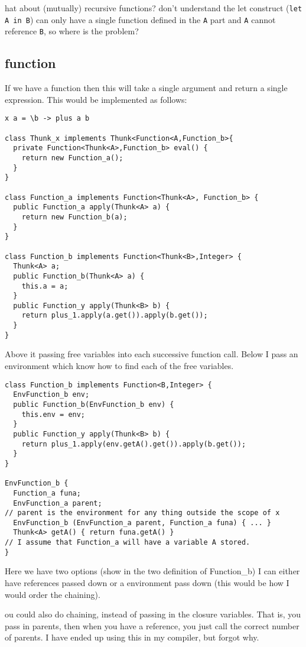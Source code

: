 \documentclass[12pt,a4paper,twoside]{article}
\def\comment#1\done{{\color{blue}#1}}
\begin{document}
\comment What about (mutually) recursive functions? \done 
\comment I don't understand the let construct (\texttt{let A in B}) can only have a single function defined in the 
 \texttt{A} part and \texttt{A} cannot reference \texttt{B}, so where is the problem? \done

\subsection{function}

If we have a function then this will take a single argument and return a single expression. This would be implemented as follows:

\begin{verbatim}
x a = \b -> plus a b

class Thunk_x implements Thunk<Function<A,Function_b>{
  private Function<Thunk<A>,Function_b> eval() {
    return new Function_a();
  }
}

class Function_a implements Function<Thunk<A>, Function_b> {
  public Function_a apply(Thunk<A> a) {
    return new Function_b(a);
  }
}

class Function_b implements Function<Thunk<B>,Integer> {
  Thunk<A> a;
  public Function_b(Thunk<A> a) {
    this.a = a;
  }
  public Function_y apply(Thunk<B> b) {
    return plus_1.apply(a.get()).apply(b.get());
  }
}
\end{verbatim}
Above it passing free variables into each successive function call. Below I pass an environment which 
know how to find each of the free variables.
\begin{verbatim}
class Function_b implements Function<B,Integer> {
  EnvFunction_b env;
  public Function_b(EnvFunction_b env) {
    this.env = env;
  }
  public Function_y apply(Thunk<B> b) {
    return plus_1.apply(env.getA().get()).apply(b.get());
  }
}

EnvFunction_b {
  Function_a funa;
  EnvFunction_a parent;
// parent is the environment for any thing outside the scope of x 
  EnvFunction_b (EnvFunction_a parent, Function_a funa) { ... }
  Thunk<A> getA() { return funa.getA() } 
// I assume that Function_a will have a variable A stored.
}
\end{verbatim}

Here we have two options (show in the two definition of Function\_b) I can either have references passed down
or a environment pass down (this would be how I would order the chaining).

\comment You could also do chaining, instead of passing in the closure variables. That is, you pass in parents, then when you have a reference, you just call the correct number of parents. I have ended up using this in my compiler, but forgot why.
\done
\end{document}
